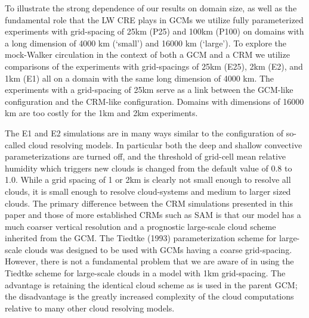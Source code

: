 \documentclass[draft]{agujournal2019}
\begin{document}
To illustrate the strong dependence of our results on domain size, as well as the fundamental role that the LW CRE plays in GCMs
we utilize fully parameterized experiments with grid-spacing of 25km (P25) and 100km (P100) on domains with a long dimension 
of 4000 km (`small') and
16000 km (`large').  To explore the mock-Walker circulation in the context of both a GCM and a CRM we utilize 
comparisons of the experiments with grid-spacings of 25km (E25), 2km (E2), and 1km (E1) all on a domain with the same long dimension 
of 4000 km.  The experiments with a grid-spacing of 25km serve as a link between the GCM-like configuration and the CRM-like 
configuration.  Domains with dimensions of 16000 km are too costly for the 1km and 2km experiments.

The E1 and E2 simulations are in many ways similar to the configuration of so-called cloud resolving models.  
In particular both the deep and shallow convective parameterizations are turned off, and the threshold of grid-cell mean relative humidity 
which triggers new clouds is changed from the default value of 0.8 to 1.0.  While a grid spacing of 1 or 2km is clearly not small enough
to resolve all clouds, it is small enough to resolve cloud-systems and medium to larger sized clouds.  The primary 
difference between the CRM simulations presented in this paper and those of more established CRMs such as SAM is that our model
has a much coarser vertical resolution and a prognostic large-scale cloud scheme inherited from the GCM.  The Tiedtke (1993) 
parameterization scheme for large-scale 
clouds was designed to be used with GCMs having a coarse grid-spacing.  However, there is not a fundamental problem that we are 
aware of in using the Tiedtke scheme for large-scale clouds in a model with 1km grid-spacing.   The advantage is retaining the 
identical cloud scheme as is used in the parent GCM; the disadvantage is the greatly increased complexity of the cloud computations 
relative to many other cloud resolving models.    
\end{document}
